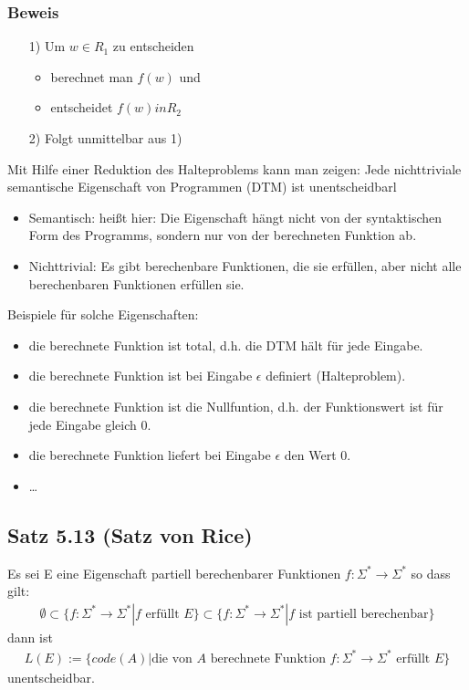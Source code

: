 \subsubsection{Beweis}
\begin{itemize}
	\item[1)] Um $w\in R_1$ zu entscheiden
	\begin{itemize}
		\item berechnet man $f(w)$ und
		\item entscheidet $f(w) in R_2$
	\end{itemize}
	\item[2)] Folgt unmittelbar aus 1)
\end{itemize}
Mit Hilfe einer Reduktion des Halteproblems kann man zeigen: Jede nichttriviale semantische Eigenschaft von Programmen (DTM) ist unentscheidbarl
\begin{itemize}
	\item Semantisch: heißt hier: Die Eigenschaft hängt nicht von der syntaktischen Form des Programms, sondern nur von der berechneten Funktion ab.
	\item Nichttrivial: Es gibt berechenbare Funktionen, die sie erfüllen, aber nicht alle berechenbaren Funktionen erfüllen sie.
\end{itemize}
Beispiele für solche Eigenschaften:
\begin{itemize}
	\item die berechnete Funktion ist total, d.h. die DTM hält für jede Eingabe.
	\item die berechnete Funktion ist bei Eingabe $\epsilon$ definiert (Halteproblem).
	\item die berechnete Funktion ist die Nullfuntion, d.h. der Funktionswert ist für jede Eingabe gleich 0.
	\item die berechnete Funktion liefert bei Eingabe $\epsilon$ den Wert 0.
	\item \ldots
\end{itemize}
\subsection{Satz 5.13 (Satz von Rice)}
Es sei E eine Eigenschaft partiell berechenbarer Funktionen $f: \Sigma^*  \to \Sigma^* $ so dass gilt:
\begin{align*}
	\emptyset \subset \{f:\Sigma^* \to \Sigma^* | f \text{ erfüllt } E\} \subset \{f: \Sigma^* \to \Sigma^* | f \text{  ist partiell berechenbar}\}
\end{align*}
dann ist
\begin{align*}
	L(E) := \{code(A) | \text{die von }A\text{ berechnete Funktion }f: \Sigma^* \to \Sigma^* \text{ erfüllt } E\}
\end{align*}
unentscheidbar.
